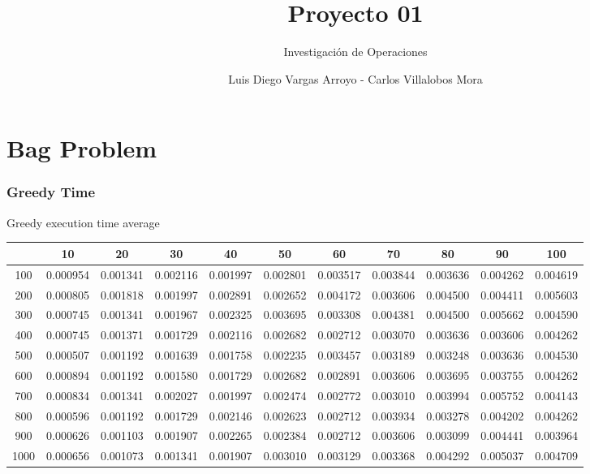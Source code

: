 \documentclass[12]{beamer}
\title{Proyecto 01}
\subtitle{Investigación de Operaciones}
\author{Luis Diego Vargas Arroyo - Carlos Villalobos Mora}
\begin{document}
\frame{\titlepage}
\section{Bag Problem}
\begin{frame}
\frametitle{Greedy Time }

Greedy execution time average
\begin{center}
\begin{adjustbox}{max width=\textwidth}
\small
\begin{tabular}{ |c|c|c|c|c|c|c|c|c|c|c|}
\hline
  & 10 & 20 & 30 & 40 & 50 & 60 & 70 & 80 & 90 & 100 \\ 
\hline
 100 & 0.000954 & 0.001341 & 0.002116 & 0.001997 & 0.002801 & 0.003517 & 0.003844 & 0.003636 & 0.004262 & 0.004619 \\ 
\hline
 200 & 0.000805 & 0.001818 & 0.001997 & 0.002891 & 0.002652 & 0.004172 & 0.003606 & 0.004500 & 0.004411 & 0.005603 \\ 
\hline
 300 & 0.000745 & 0.001341 & 0.001967 & 0.002325 & 0.003695 & 0.003308 & 0.004381 & 0.004500 & 0.005662 & 0.004590 \\ 
\hline
 400 & 0.000745 & 0.001371 & 0.001729 & 0.002116 & 0.002682 & 0.002712 & 0.003070 & 0.003636 & 0.003606 & 0.004262 \\ 
\hline
 500 & 0.000507 & 0.001192 & 0.001639 & 0.001758 & 0.002235 & 0.003457 & 0.003189 & 0.003248 & 0.003636 & 0.004530 \\ 
\hline
 600 & 0.000894 & 0.001192 & 0.001580 & 0.001729 & 0.002682 & 0.002891 & 0.003606 & 0.003695 & 0.003755 & 0.004262 \\ 
\hline
 700 & 0.000834 & 0.001341 & 0.002027 & 0.001997 & 0.002474 & 0.002772 & 0.003010 & 0.003994 & 0.005752 & 0.004143 \\ 
\hline
 800 & 0.000596 & 0.001192 & 0.001729 & 0.002146 & 0.002623 & 0.002712 & 0.003934 & 0.003278 & 0.004202 & 0.004262 \\ 
\hline
 900 & 0.000626 & 0.001103 & 0.001907 & 0.002265 & 0.002384 & 0.002712 & 0.003606 & 0.003099 & 0.004441 & 0.003964 \\ 
\hline
 1000 & 0.000656 & 0.001073 & 0.001341 & 0.001907 & 0.003010 & 0.003129 & 0.003368 & 0.004292 & 0.005037 & 0.004709 \\ 
\hline
\end{tabular}
\end{adjustbox}
\end{center}

\end{frame}
\end{document}
